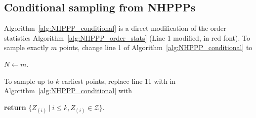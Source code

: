 \documentclass[article,nojss]{jss}\usepackage[]{graphicx}\usepackage[]{xcolor}
\begin{document}
\begin{appendix}


\newpage
\section{Conditional sampling from NHPPPs} \label{app:conditional_sampling}
Algorithm~\ref{alg:NHPPP_conditional} is a direct modification of the order statistics Algorithm~\ref{alg:NHPPP_order_stats} (Line 1 modified, in red font).
To sample exactly $m$ points, change line 1 of Algorithm~\ref{alg:NHPPP_conditional} to
\begin{center}
$N \gets m$.
\end{center}
To sample up to $k$ earliest points, replace line 11 with in Algorithm~\ref{alg:NHPPP_conditional} with
\begin{center}
\textbf{return} {$\{Z_{(i)} \ | \ i \le k, Z_{(i)} \in \mathcal{Z}\}$}.
\end{center}









\end{appendix}
\newpage
\end{document}
